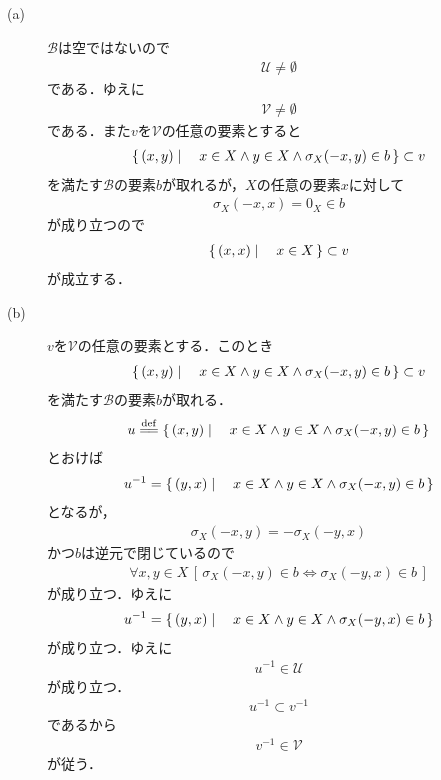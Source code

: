 	\begin{description}
		\item[(a)] $\mathscr{B}$は空ではないので
			\begin{align}
				\mathscr{U} \neq \emptyset
			\end{align}
			である．ゆえに
			\begin{align}
				\mathscr{V} \neq \emptyset
			\end{align}
			である．また$v$を$\mathscr{V}$の任意の要素とすると
			\begin{align}
				\left\{\, (x,y) \mid \quad x \in X \wedge y \in X \wedge \sigma_X(-x,y) \in b\, \right\} \subset v
			\end{align}
			を満たす$\mathscr{B}$の要素$b$が取れるが，$X$の任意の要素$x$に対して
			\begin{align}
				\sigma_X(-x,x) = 0_X \in b
			\end{align}
			が成り立つので
			\begin{align}
				\left\{\, (x,x) \mid \quad x \in X\, \right\} \subset v
			\end{align}
			が成立する．
			
		\item[(b)] $v$を$\mathscr{V}$の任意の要素とする．このとき
			\begin{align}
				\left\{\, (x,y) \mid \quad x \in X \wedge y \in X \wedge \sigma_X(-x,y) \in b\, \right\} \subset v
			\end{align}
			を満たす$\mathscr{B}$の要素$b$が取れる．
			\begin{align}
				u \defeq \Set{(x,y)}{x \in X \wedge y \in X \wedge \sigma_X(-x,y) \in b}
			\end{align}
			とおけば
			\begin{align}
				u^{-1} = \left\{\, (y,x) \mid \quad x \in X \wedge y \in X \wedge \sigma_X(-x,y) \in b\, \right\}
			\end{align}
			となるが，
			\begin{align}
				\sigma_X(-x,y) = -\sigma_X(-y,x)
			\end{align}
			かつ$b$は逆元で閉じているので
			\begin{align}
				\forall x,y \in X\, \left[\, \sigma_X(-x,y) \in b \Longleftrightarrow \sigma_X(-y,x) \in b\, \right]
			\end{align}
			が成り立つ．ゆえに
			\begin{align}
				u^{-1} = \left\{\, (y,x) \mid \quad x \in X \wedge y \in X \wedge \sigma_X(-y,x) \in b\, \right\}
			\end{align}
			が成り立つ．ゆえに
			\begin{align}
				u^{-1} \in \mathscr{U}
			\end{align}
			が成り立つ．
			\begin{align}
				u^{-1} \subset v^{-1}
			\end{align}
			であるから
			\begin{align}
				v^{-1} \in \mathscr{V}
			\end{align}
			が従う．
			

\end{description}
